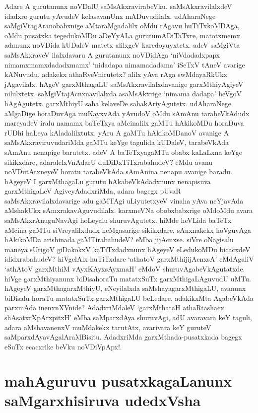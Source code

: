 Adare A gurutanunx noVDalU saMsAkxravirabeVku. saMsAkxravilalxdeV idadxre gurutu yAvudeV kelasavanUnx mADuvudilalx. udAharaNege saMgiVtagAranobabxnige aMtaraMgadalilx oMdu rAgavu huTiTxkoMDAga, oMdu pusatxka tegedukoMDu aDeYyALa gurutumADiTaTxre, matotxmemx adanunx noVDida kUDaleV matetx alilxgeV karedoyuyxtetx. adeV saMgiVta saMsAkxraveV ilalxdavaru A gurutanunx noVDidAga `niVdadadxpapx nimamxmamxdadadxmamx' `nidadapa nimamadadama' iSeTxV tAneV avarige kANuvudu. adakekx athaRveVnirutetx? alilx yAva rAga swMdayaRkUkx jAgavilalx. hAgeV garxMthagaLU saMsAkxravilalxdavanige garxMthiyAgiyeV nilulxtetx.  saMgiVtajAcnxnavilalxda asaMsAkxrige `nimama dadapa' heVgoV hAgAgutetx. garxMthiyU saha kelaveDe sahakAriyAgutetx. udAharaNege aMgaDige horaDuvAga muKayxvAda yAvudoV oMdu sAmAnu tarabeVkAdudx mareyadeV iralu namamx baTeTxya aMcinalilx gaMTu hAkikoMDu horaDuva rUDhi haLeya kAladalilxtutx. yAru A gaMTu hAkikoMDanoV avanige A saMsAkxraviruvudariMda gaMTu keYge tagulida kUDaleV, tarabeVkAda sAmAnu nenapige barutetx. adeV A baTeTxyagaMTu obabx kaLaLxna keYge sikikxdare, adaralelxVnAdarU duDiDxTiTxrabahudeV? eMdu avanu noVDutAtxneyeV horatu tarabeVkAda sAmAnina nenapu avanige baradu. hAgeyeV I garxMthagaLu gurutu hAkabeVkAdadxnunx  nenapisuva garxMthigaLeV AgiveyAdadxriMda, adara bagegx pUvaR saMsAkxravilalxdavarige adu gaMTAgi uLiyutetxyeV vinaha yAva neYjavAda aMshakUkx sAmxrakavAguvudilalx. karxmeVNa obobxbabxrige oMdoMdu avara saMsAkxrAnuguNavAgi hoLeyalu shuruvAgutetx. hiMde heVLida baTeTx aMcina gaMTu siVreyalilxdudx heMgasarige sikikxdare, sAnxnakekx hoVguvAga hAkikoMDa arishinada gaMTirabahudeV? eMba jijAcnxse. siVre oNagisalu maneya sUrigoV giDakokxV kaTiTxdadxnunx hAgeyeV eLedukoMDu bicacxdeV ididxrabahudeV? hiVgelAlx huTiTxdare `athatoV garxMthijijAcnxsA' eMdAgaliV `athAtoV garxMthiM vAyxKAyxsAyxmaH' eMdoV shuruvAgabeVkAgutatxde. hiVge garxMthiyanunx biDisahoraTu matatxSuTx garxMthigaLAguvudU uMTu. hAgeyeV garxMthagarxMthiyU, eNeyilalxda saMshayagarxMthigaLU, avanunx biDisalu horaTu matatxSuTx  garxMthigaLU beLedare, adakikxMta AgabeVkAda parxmAda inenxnXVnide? AdadxriMdaleV `garxMthataH athaRtashacx shAsatxrXpArxpitxH'\label{105} eMba saMparxdAya shuruvAgi, adU avaravara keY taguli, adara aMshavanenxV muMdakekx tarutAtx, avarivara keY guruteV saMparxdAyavAgalAraMBisitu. AdadxriMda garxMthada-pusatxkada bagegx eSuTx ecacxrike beVku noVDiVpApx!.

\section*{mahAguruvu pusatxkagaLanunx saMgarxhisiruva udedxVsha}

